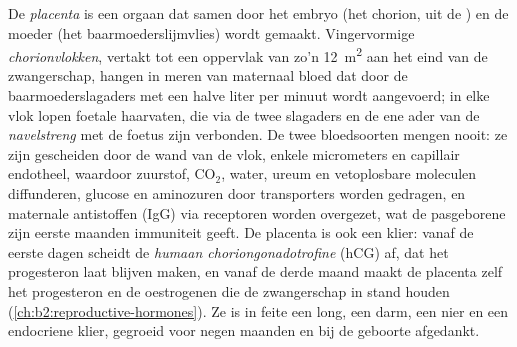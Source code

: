 \begin{definition}[De placenta]\label{def:b2:mammal-reproduction:placenta}
De \emph{placenta} is een orgaan dat samen door het embryo (het chorion,
uit de ) en de moeder (het baarmoederslijmvlies) wordt gemaakt.
Vingervormige \emph{chorionvlokken}, vertakt tot een oppervlak van zo'n
\qty{12}{m^2} aan het eind van de zwangerschap, hangen in meren van
maternaal bloed dat door de baarmoederslagaders met een halve liter per
minuut wordt aangevoerd; in elke vlok lopen foetale haarvaten, die via de
twee slagaders en de ene ader van de \emph{navelstreng} met de foetus zijn
verbonden. De twee bloedsoorten mengen nooit: ze zijn gescheiden door de
wand van de vlok, enkele micrometers  en capillair endotheel,
waardoor zuurstof,
$\mathrm{CO_2}$, water, ureum en vetoplosbare moleculen diffunderen,
glucose en aminozuren door transporters worden gedragen, en maternale
antistoffen (IgG) via receptoren worden overgezet, wat de pasgeborene zijn
eerste maanden immuniteit geeft. De placenta is ook een klier: vanaf de
eerste dagen scheidt de  \emph{humaan
choriongonadotrofine} (hCG) af, dat het  progesteron laat
blijven maken, en vanaf de derde maand maakt de placenta zelf het
progesteron en de oestrogenen die de zwangerschap in stand houden
(\cref{ch:b2:reproductive-hormones}). Ze is in feite een long, een darm,
een nier en een endocriene klier, gegroeid voor negen maanden en bij de
geboorte afgedankt.
\end{definition}

